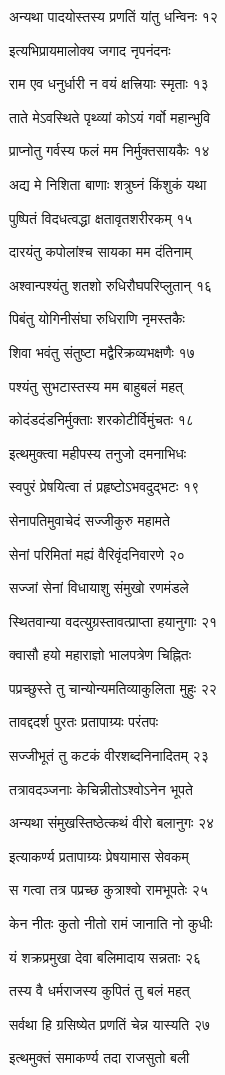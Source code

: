 अन्यथा पादयोस्तस्य प्रणतिं यांतु धन्विनः १२

इत्यभिप्रायमालोक्य जगाद नृपनंदनः

राम एव धनुर्धारी न वयं क्षत्त्रियाः स्मृताः १३

ताते मेऽवस्थिते पृथ्व्यां कोऽयं गर्वो महान्भुवि

प्राप्नोतु गर्वस्य फलं मम निर्मुक्तसायकैः १४

अद्य मे निशिता बाणाः शत्रुघ्नं किंशुकं यथा

पुष्पितं विदधत्वद्धा क्षतावृतशरीरकम् १५

दारयंतु कपोलांश्च सायका मम दंतिनाम्

अश्वान्पश्यंतु शतशो रुधिरौघपरिप्लुतान् १६

पिबंतु योगिनीसंघा रुधिराणि नृमस्तकैः

शिवा भवंतु संतुष्टा मद्वैरिक्रव्यभक्षणैः १७

पश्यंतु सुभटास्तस्य मम बाहुबलं महत्

कोदंडदंडनिर्मुक्ताः शरकोटीर्विमुंचतः १८

इत्थमुक्त्वा महीपस्य तनुजो दमनाभिधः

स्वपुरं प्रेषयित्वा तं प्रहृष्टोऽभवदुद्भटः १९

सेनापतिमुवाचेदं सज्जीकुरु महामते

सेनां परिमितां मह्यं वैरिवृंदनिवारणे २०

सज्जां सेनां विधायाशु संमुखो रणमंडले

स्थितवान्या वदत्युग्रस्तावत्प्राप्ता हयानुगाः २१

क्वासौ हयो महाराज्ञो भालपत्रेण चिह्नितः

पप्रच्छुस्ते तु चान्योन्यमतिव्याकुलिता मुहुः २२

तावद्ददर्श पुरतः प्रतापाग्र्यः परंतपः

सज्जीभूतं तु कटकं वीरशब्दनिनादितम् २३

तत्रावदञ्जनाः केचिन्नीतोऽश्वोऽनेन भूपते

अन्यथा संमुखस्तिष्ठेत्कथं वीरो बलानुगः २४

इत्याकर्ण्य प्रतापाग्र्यः प्रेषयामास सेवकम्

स गत्वा तत्र पप्रच्छ कुत्राश्वो रामभूपतेः २५

केन नीतः कुतो नीतो रामं जानाति नो कुधीः

यं शक्रप्रमुखा देवा बलिमादाय सन्नताः २६

तस्य वै धर्मराजस्य कुपितं तु बलं महत्

सर्वथा हि ग्रसिष्येत प्रणतिं चेन्न यास्यति २७

इत्थमुक्तं समाकर्ण्य तदा राजसुतो बली

